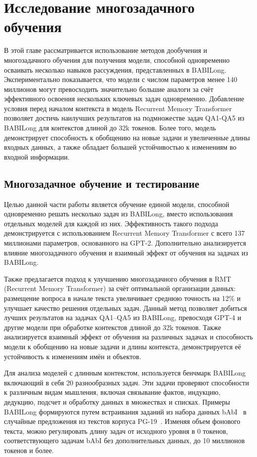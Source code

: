 \chapter{Исследование многозадачного обучения}\label{ch:ch5}

В этой главе рассматривается использование методов дообучения и многозадачного обучения для получения модели, способной одновременно осваивать несколько навыков рассуждения, представленных в BABILong. Экспериментально показывается, что модели с числом параметров менее 140 миллионов могут превосходить значительно большие аналоги за счёт эффективного освоения нескольких ключевых задач одновременно. Добавление условия перед началом контекста в модель Recurrent Memory Transformer позволяет достичь наилучших результатов на подмножестве задач QA1-QA5 из BABILong для контекстов длиной до 32k токенов. Более того, модель демонстрирует способность к обобщению на новые задачи и увеличенные длины входных данных, а также обладает большей устойчивостью к изменениям во входной информации.

\section{Многозадачное обучение и тестирование}

Целью данной части работы является обучение единой модели, способной одновременно решать несколько задач из BABILong, вместо использования отдельных моделей для каждой из них. Эффективность такого подхода демонстрируется с использованием Recurrent Memory Transformer с всего 137 миллионами параметров, основанного на GPT-2. Дополнительно анализируется влияние многозадачного обучения и взаимный эффект от обучения на задачах из BABILong.

Также предлагается подход к улучшению многозадачного обучения в RMT (Recurrent Memory Transformer) за счёт оптимальной организации данных: размещение вопроса в начале текста увеличивает среднюю точность на 12\% и улучшает качество решения отдельных задач. Данный метод позволяет добиться лучших результатов на задачах QA1–QA5 из BABILong, превосходя GPT-4 и другие модели при обработке контекстов длиной до 32k токенов. Также анализируется взаимный эффект от обучения на различных задачах и способность модели к обобщению на новые задачи и длины контекста, демонстрируется её устойчивость к изменениям имён и объектов.

Для анализа моделей с длинным контекстом, используется бенчмарк BABILong включающий в себя 20 разнообразных задач. Эти задачи проверяют способности к различным видам мышления, включая связывание фактов, индукцию, дедукцию, подсчет и обработку данных в множествах и списках. Примеры BABILong формируются путем встраивания заданий из набора данных bAbI~\cite{WestonBCM15} в случайные предложения из текстов корпуса PG-19~\cite{rae2019compressive}. Изменяя объем фонового текста, можно регулировать длину задач от исходного уровня в 0 токенов, соответствующего задачам bAbI без дополнительных данных, до 10 миллионов токенов и более.


